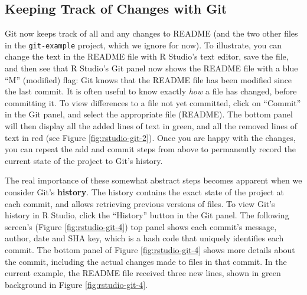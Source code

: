 \documentclass[
  american,
  ,doc,floatsintext]{apa6}
\begin{document}
\hypertarget{keeping-track-of-changes-with-git}{%
\subsection{Keeping Track of Changes with Git}\label{keeping-track-of-changes-with-git}}

Git now keeps track of all and any changes to README (and the two other files in the \texttt{git-example} project, which we ignore for now). To illustrate, you can change the text in the README file with R Studio's text editor, save the file, and then see that R Studio's Git panel now shows the README file with a blue \enquote{M} (modified) flag: Git knows that the README file has been modified since the last commit. It is often useful to know exactly \emph{how} a file has changed, before committing it. To view differences to a file not yet committed, click on \enquote{Commit} in the Git panel, and select the appropriate file (README). The bottom panel will then display all the added lines of text in green, and all the removed lines of text in red (see Figure \ref{fig:rstudio-git-2}). Once you are happy with the changes, you can repeat the add and commit steps from above to permanently record the current state of the project to Git's history.

The real importance of these somewhat abstract steps becomes apparent when we consider Git's \textbf{history}. The history contains the exact state of the project at each commit, and allows retrieving previous versions of files. To view Git's history in R Studio, click the \enquote{History} button in the Git panel. The following screen's (Figure \ref{fig:rstudio-git-4}) top panel shows each commit's message, author, date and SHA key, which is a hash code that uniquely identifies each commit. The bottom panel of Figure \ref{fig:rstudio-git-4} shows more details about the commit, including the actual changes made to files in that commit. In the current example, the README file received three new lines, shown in green background in Figure \ref{fig:rstudio-git-4}.
\end{document}
